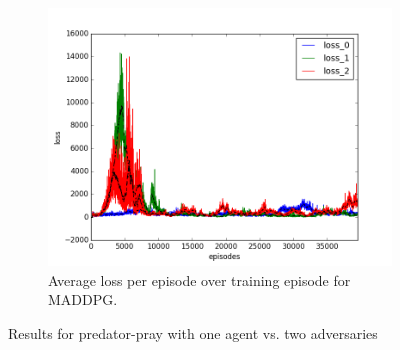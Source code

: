 \begin{figure}[h]
\begin{subfigure}[h]{\figscale\linewidth}
    \includegraphics[trim=10 10 10 10,clip,width=\linewidth]
    {../results/maddpg_2vs1/loss.png}
    \caption{Average loss per episode over training episode for MADDPG.}
    \label{fig:maddpg-2vs1-loss}
  \end{subfigure}


  \caption{Results for predator-pray with one agent vs. two adversaries}
  \label{fig:2vs1}
\end{figure}
\FloatBarrier

